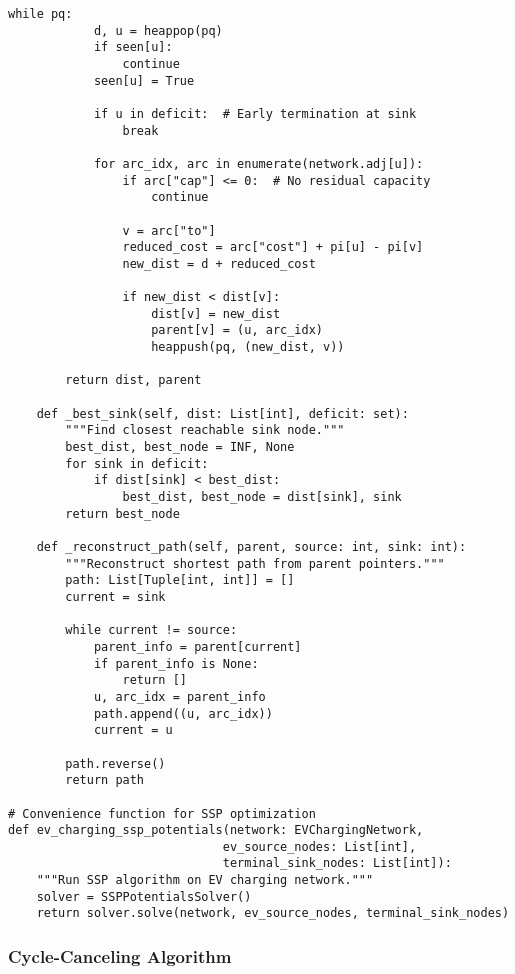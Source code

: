 \documentclass[12pt,a4paper]{article}
\begin{document}
\begin{lstlisting}[caption=SSP Algorithm with Potentials]
        while pq:
            d, u = heappop(pq)
            if seen[u]:
                continue
            seen[u] = True
            
            if u in deficit:  # Early termination at sink
                break
            
            for arc_idx, arc in enumerate(network.adj[u]):
                if arc["cap"] <= 0:  # No residual capacity
                    continue
                
                v = arc["to"]
                reduced_cost = arc["cost"] + pi[u] - pi[v]
                new_dist = d + reduced_cost
                
                if new_dist < dist[v]:
                    dist[v] = new_dist
                    parent[v] = (u, arc_idx)
                    heappush(pq, (new_dist, v))
        
        return dist, parent
    
    def _best_sink(self, dist: List[int], deficit: set):
        """Find closest reachable sink node."""
        best_dist, best_node = INF, None
        for sink in deficit:
            if dist[sink] < best_dist:
                best_dist, best_node = dist[sink], sink
        return best_node
    
    def _reconstruct_path(self, parent, source: int, sink: int):
        """Reconstruct shortest path from parent pointers."""
        path: List[Tuple[int, int]] = []
        current = sink
        
        while current != source:
            parent_info = parent[current]
            if parent_info is None:
                return []
            u, arc_idx = parent_info
            path.append((u, arc_idx))
            current = u
        
        path.reverse()
        return path

# Convenience function for SSP optimization
def ev_charging_ssp_potentials(network: EVChargingNetwork, 
                              ev_source_nodes: List[int],
                              terminal_sink_nodes: List[int]):
    """Run SSP algorithm on EV charging network."""
    solver = SSPPotentialsSolver()
    return solver.solve(network, ev_source_nodes, terminal_sink_nodes)
\end{lstlisting}

\subsubsection{Cycle-Canceling Algorithm}
\end{document}
